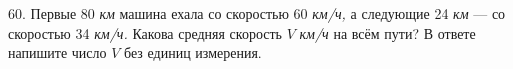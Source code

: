 60. Первые 80 {\it км} машина ехала со скоростью 60 {\it км/ч,} а следующие 24 {\it км} --- со скоростью 34 {\it км/ч.} Какова средняя скорость $V$ {\it км/ч} на всём пути? В ответе напишите число $V$ без единиц измерения.\\
